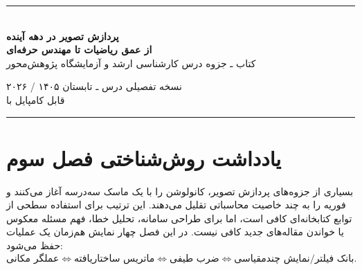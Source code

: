 \documentclass[12pt,openany,oneside]{book}
\begin{document}
\begin{titlepage}
\centering
\vspace*{0.9cm}
{\color{DeepBlue}\rule{0.9\textwidth}{1.1pt}}\\[1.0cm]
{\Huge\bfseries پردازش تصویر در دهه آینده\\[0.3cm]}
{\LARGE\bfseries از عمق ریاضیات تا مهندس حرفه‌ای\\[0.85cm]}
{\Large کتاب ـ جزوه درس کارشناسی ارشد و آزمایشگاه پژوهش‌محور\\[1.1cm]}


\vfill
{\large نسخه تفصیلی درس ـ تابستان ۱۴۰۵ / ۲۰۲۶}\\[0.4cm]
{\normalsize قابل کامپایل با }\\[0.8cm]
{\color{DeepBlue}\rule{0.9\textwidth}{1.1pt}}
\end{titlepage}

\frontmatter
\chapter*{یادداشت روش‌شناختی فصل سوم}

بسیاری از جزوه‌های پردازش تصویر، کانولوشن را با یک ماسک سه‌درسه آغاز می‌کنند و فوریه را به چند
خاصیت محاسباتی تقلیل می‌دهند. این ترتیب برای استفاده سطحی از توابع کتابخانه‌ای کافی است، اما برای
طراحی سامانه، تحلیل خطا، فهم مسئله معکوس یا خواندن مقاله‌های جدید کافی نیست. در این فصل چهار نمایش
هم‌زمان یک عملیات حفظ می‌شود:
\begin{equation}
\boxed{
\text{عملگر مکانی}
\Longleftrightarrow
\text{ماتریس ساختاریافته}
\Longleftrightarrow
\text{ضرب طیفی}
\Longleftrightarrow
\text{بانک فیلتر/نمایش چندمقیاسی}.}
\end{equation}
\end{document}
